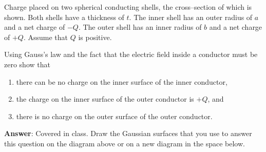 \documentclass{article}
\begin{document}
Charge placed on two spherical conducting shells, the cross--section of which is shown. Both shells have a thickness of $t$. The inner shell has an outer radius of $a$ and a net charge of $-Q$. The outer shell has an inner radius of $b$ and a net charge of $+Q$. Assume that $Q$ is positive.



Using Gauss's law and the fact that the electric field inside a conductor must be zero show that

\begin{enumerate}

  \item there can be no charge on the inner surface of the inner conductor,

  \item the charge on the inner surface of the outer conductor is $+Q$, and

  \item there is no charge on the outer surface of the outer conductor.

\end{enumerate}

\ifsolutions
  \textbf{Answer}: Covered in class.
\fi
Draw the Gaussian surfaces that you use to answer this question on the diagram above or on a new diagram in the space below.
\end{document}
